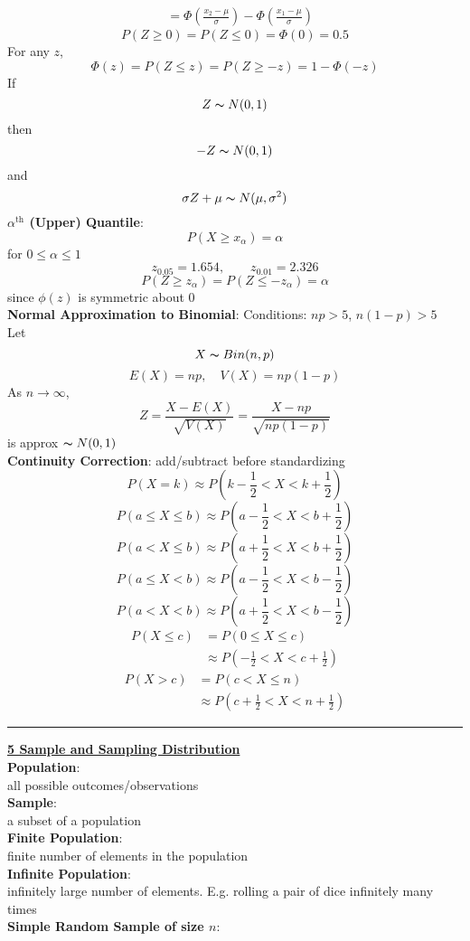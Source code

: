 \documentclass{article}
\begin{document}
\begin{multicols*}{3}
\begin{align*}
&=\Phi(\frac{x_2-\mu}{\sigma})-\Phi(\frac{x_1-\mu}{\sigma})
\end{align*}
$$P(Z\geq0)=P(Z\leq0)=\Phi(0)=0.5$$
For any $z$, $$\Phi(z)=P(Z\leq z)=P(Z\geq -z)=1-\Phi(-z)$$
If $$Z\thicksim N(0,1)$$ then
$$-Z\thicksim N(0,1)$$ and $$ \sigma Z+\mu\thicksim N(\mu,\sigma^2)$$
\textbf{$\alpha^\text{th}$ (Upper) Quantile}: \\
$$P(X\geq x_\alpha)=\alpha$$ 
for $0\leq\alpha\leq1$\\
$$z_{0.05}=1.654, \qquad z_{0.01}=2.326$$
$$P(Z\geq z_\alpha)=P(Z\leq -z_\alpha)=\alpha$$ since $\phi(z)$ is symmetric about 0\\
\textbf{Normal Approximation to Binomial}: Conditions: $np>5$, $n(1-p)>5$\\
Let $$X\thicksim Bin(n,p)$$
$$ E(X)=np, \quad V(X)=np(1-p)$$
As $n\to \infty$, $$Z=\frac{X-E(X)}{\sqrt{V(X)}}=\frac{X-np}{\sqrt{np(1-p)}}$$ is approx $\thicksim N(0,1)$\\
\textbf{Continuity Correction}: add/subtract before standardizing\\
$$P(X=k)\approx P(k-\frac{1}{2}<X<k+\frac{1}{2})$$
$$P(a\leq X\leq b)\approx P(a-\frac{1}{2}<X<b+\frac{1}{2})$$
$$P(a< X\leq b)\approx P(a+\frac{1}{2}<X<b+\frac{1}{2})$$
$$P(a\leq X< b)\approx P(a-\frac{1}{2}<X<b-\frac{1}{2})$$
$$P(a< X< b)\approx P(a+\frac{1}{2}<X<b-\frac{1}{2})$$
\begin{align*}
P(X\leq c)&=P(0\leq X\leq c)\\
&\approx P(-\frac{1}{2}<X<c+\frac{1}{2})
\end{align*}
\begin{align*}
P(X>c)&=P(c<X\leq n)\\
&\approx P(c+\frac{1}{2}<X<n+\frac{1}{2})
\end{align*}
\rule{193pt}{0.2pt}
\textbf{\underline{5 Sample and Sampling Distribution}}\\
\textbf{Population}: \\
all possible outcomes/observations\\
\textbf{Sample}:\\
a subset of a population\\
\textbf{Finite Population}:\\
finite number of elements in the population\\
\textbf{Infinite Population}:\\
infinitely large number of elements. E.g. rolling a pair of dice infinitely many times\\
\textbf{Simple Random Sample of size $n$}:\\

\end{multicols*}
\end{document}
